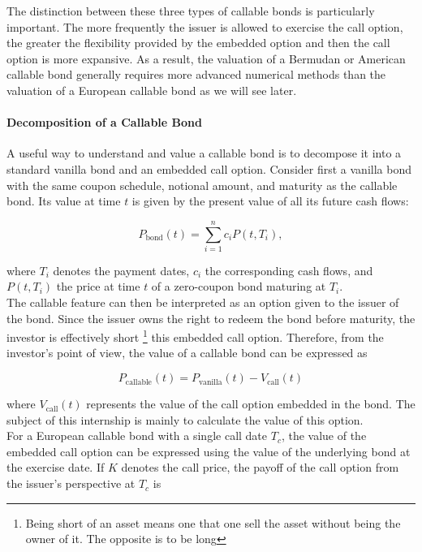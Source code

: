 \documentclass{article}
\begin{document}
The distinction between these three types of callable bonds is particularly important. The more frequently the issuer is allowed to exercise the call option, the greater the flexibility provided by the embedded option and then the call option is more expansive. As a result, the valuation of a Bermudan or American callable bond generally requires more advanced numerical methods than the valuation of a European callable bond as we will see later.

\paragraph{Decomposition of a Callable Bond}

A useful way to understand and value a callable bond is to decompose it into a standard vanilla bond and an embedded call option. Consider first a vanilla bond with the same coupon schedule, notional amount, and maturity as the callable bond. Its value at time $t$ is given by the present value of all its future cash flows:

\begin{equation}
P_{\text{bond}}(t)
=
\sum_{i=1}^{n} c_i P(t,T_i),
\end{equation}

where $T_i$ denotes the payment dates, $c_i$ the corresponding cash flows, and $P(t,T_i)$ the price at time $t$ of a zero-coupon bond maturing at $T_i$.
\\

The callable feature can then be interpreted as an option given to the issuer of the bond. Since the issuer owns the right to redeem the bond before maturity, the investor is effectively short \footnote{Being short of an asset means one that one sell the asset without being the owner of it. The opposite is to be long} this embedded call option. Therefore, from the investor's point of view, the value of a callable bond can be expressed as

\begin{equation}
P_{\text{callable}}(t)
=
P_{\text{vanilla}}(t)
-
V_{\text{call}}(t)
\end{equation}

where $V_{\text{call}}(t)$ represents the value of the call option embedded in the bond. The subject of this internship is mainly to calculate the value of this option.
\\

For a European callable bond with a single call date $T_c$, the value of the embedded call option can be expressed using the value of the underlying bond at the exercise date. If $K$ denotes the call price, the payoff of the call option from the issuer's perspective at $T_c$ is
\end{document}
